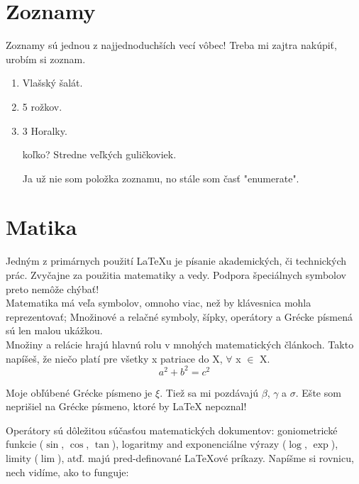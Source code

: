 \documentclass[12pt]{article}
\begin{document}
\section{Zoznamy}
Zoznamy sú jednou z najjednoduchších vecí vôbec! Treba mi zajtra nakúpiť, urobím si zoznam.
\begin{enumerate} %
  \item Vlašský šalát.
  \item 5 rožkov.
  \item 3 Horalky.
  \item[koľko?] Stredne veľkých guličkoviek.

  Ja už nie som položka zoznamu, no stále som časť "enumerate".

\end{enumerate} %

\section{Matika}

Jedným z primárnych použití LaTeXu je písanie akademických, či technických prác. Zvyčajne za použitia matematiky a vedy. Podpora špeciálnych symbolov preto nemôže chýbať!\\

Matematika má veľa symbolov, omnoho viac, než by klávesnica mohla reprezentovať;
Množinové a relačné symboly, šípky, operátory a Grécke písmená sú len malou ukážkou.\\

Množiny a relácie hrajú hlavnú rolu v mnohých matematických článkoch.
Takto napíšeš, že niečo platí pre všetky x patriace do X, $\forall$ x $\in$ X. \\

\[a^2 + b^2 = c^2 \]

Moje obľúbené Grécke písmeno je $\xi$. Tiež sa mi pozdávajú $\beta$, $\gamma$ a $\sigma$.
Ešte som neprišiel na Grécke písmeno, ktoré by LaTeX nepoznal!

Operátory sú dôležitou súčasťou matematických dokumentov: 
goniometrické funkcie ($\sin$, $\cos$, $\tan$), 
logaritmy and exponenciálne výrazy ($\log$, $\exp$), 
limity ($\lim$), atď. 
majú pred-definované LaTeXové príkazy. 
Napíšme si rovnicu, nech vidíme, ako to funguje: \\
\end{document}
